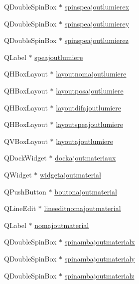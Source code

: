 \begin{DoxyCompactItemize}
\item 
Q\+Double\+Spin\+Box $\ast$ \hyperlink{class_main_window_a433afe9bb63e53ccf2253eb39ee6ebd1}{spinspeajoutlumierex}
\item 
Q\+Double\+Spin\+Box $\ast$ \hyperlink{class_main_window_afd72a5b29130fa092fdb6cb9b05f937c}{spinspeajoutlumierey}
\item 
Q\+Double\+Spin\+Box $\ast$ \hyperlink{class_main_window_a69368f55e2df16fac69b4bc9b7b24696}{spinspeajoutlumierez}
\item 
Q\+Label $\ast$ \hyperlink{class_main_window_a549c42dd7554a4414ca34fc253457889}{speajoutlumiere}
\item 
Q\+H\+Box\+Layout $\ast$ \hyperlink{class_main_window_a0cffcdf1b642b23f05b7ed78beaeb066}{layoutnomajoutlumiere}
\item 
Q\+H\+Box\+Layout $\ast$ \hyperlink{class_main_window_a0afe930901084cdb5835537298d77219}{layoutposajoutlumiere}
\item 
Q\+H\+Box\+Layout $\ast$ \hyperlink{class_main_window_a8ce502c6bd1f174f2e13d491f0797056}{layoutdifajoutlumiere}
\item 
Q\+H\+Box\+Layout $\ast$ \hyperlink{class_main_window_a31b82741cd4c48d8e3b85981173fd1ad}{layoutspeajoutlumiere}
\item 
Q\+V\+Box\+Layout $\ast$ \hyperlink{class_main_window_ab54462c9ca68986b780c8fb83300336c}{layoutajoutlumiere}
\item 
Q\+Dock\+Widget $\ast$ \hyperlink{class_main_window_a033d7bd189e33389081c3352c3b41021}{dockajoutmateriaux}
\item 
Q\+Widget $\ast$ \hyperlink{class_main_window_a071e7995e629a7b42ddbc5f54eae7dd3}{widgetajoutmaterial}
\item 
Q\+Push\+Button $\ast$ \hyperlink{class_main_window_a9d0608c267dd8f7898df41de4dda0be1}{boutonajoutmaterial}
\item 
Q\+Line\+Edit $\ast$ \hyperlink{class_main_window_a9f41187b00dba6b31cc4411bdc3e673b}{lineeditnomajoutmaterial}
\item 
Q\+Label $\ast$ \hyperlink{class_main_window_ae0e05e579231d8e870d07ba9e4ae7223}{nomajoutmaterial}
\item 
Q\+Double\+Spin\+Box $\ast$ \hyperlink{class_main_window_a307a29066af1090776251ddc1e067388}{spinambajoutmaterialx}
\item 
Q\+Double\+Spin\+Box $\ast$ \hyperlink{class_main_window_a5f6a9da53b2ff428ff4ebf5ec4d469ff}{spinambajoutmaterialy}
\item 
Q\+Double\+Spin\+Box $\ast$ \hyperlink{class_main_window_a6969ed6db37482077ffe51c2b00a4b82}{spinambajoutmaterialz}

\end{DoxyCompactItemize}
